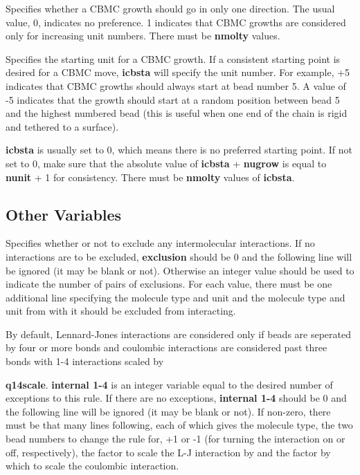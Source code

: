 \documentclass[12pt,letterpaper]{article}
\begin{document}
{{{{ Specifies whether a CBMC growth should go
in only one direction.  The usual value, 0, indicates no preference.
1 indicates that CBMC growths are considered only for increasing unit numbers.
There must be {\textbf{nmolty}} values.

 Specifies the starting unit for a CBMC growth.
If a consistent starting point is desired for a CBMC move, 
{\textbf {icbsta}} will specify the unit number.  
For example, +5 indicates that CBMC growths should always start at bead number 5.
A value of -5 indicates that the growth should start at
a random position between bead 5 and the highest numbered bead
(this is useful when one end of the chain is rigid and tethered to a surface). 
{\textbf{icbsta} is usually set to 0, which means there is no preferred starting point.
If not set to 0, make sure that the absolute value of {\textbf{icbsta}} +
{\textbf{nugrow}} is equal to {\textbf{nunit}} + 1 for consistency. 
There must be {\textbf{nmolty}} values of {\textbf {icbsta}}. 

\subsection{Other Variables}

 Specifies whether or not to exclude any
intermolecular interactions.  
If no interactions are to be excluded, {\textbf{exclusion}} should be 0 
and the following line will be ignored (it may be blank or not).
Otherwise an integer value should be used to indicate the number of pairs
of exclusions.  For each value, there must be one additional line
specifying the molecule type and unit and the molecule type and unit
from with it should be excluded from interacting.

 By default, Lennard-Jones interactions are
considered only if beads are seperated by four or more bonds and
coulombic interactions are considered past three bonds with 1-4
interactions scaled by {\textbf{q14scale}.  {\textbf{internal 1-4}} is an integer variable
equal to the desired number of exceptions to this rule.
If there are no exceptions, {\textbf{internal 1-4}} should be 0 and the following line 
will be ignored (it may be blank or not).
If non-zero, there must be that many lines following, 
each of which gives the molecule type, the two bead numbers to
change the rule for, +1 or -1 (for turning the interaction on or off,
respectively), the factor to scale the L-J interaction by and the
factor by which to scale the coulombic interaction.  

}}}}}}
\end{document}
